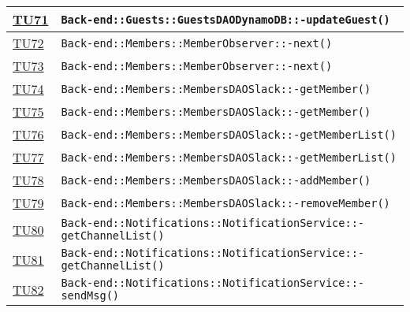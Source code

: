 \begin{longtable}{|>{\centering}m{1cm}|m{12cm}<{\centering}|}
\hyperlink{TU71}{TU71} & \texttt{Back-end::Guests::GuestsDAODynamoDB::-\linebreak updateGuest()}\\ \hline

\hyperlink{TU72}{TU72} & \texttt{Back-end::Members::MemberObserver::-\linebreak next()}\\ \hline

\hyperlink{TU73}{TU73} & \texttt{Back-end::Members::MemberObserver::-\linebreak next()}\\ \hline

\hyperlink{TU74}{TU74} & \texttt{Back-end::Members::MembersDAOSlack::-\linebreak getMember()}\\ \hline

\hyperlink{TU75}{TU75} & \texttt{Back-end::Members::MembersDAOSlack::-\linebreak getMember()}\\ \hline

\hyperlink{TU76}{TU76} & \texttt{Back-end::Members::MembersDAOSlack::-\linebreak getMemberList()}\\ \hline

\hyperlink{TU77}{TU77} & \texttt{Back-end::Members::MembersDAOSlack::-\linebreak getMemberList()}\\ \hline

\hyperlink{TU78}{TU78} & \texttt{Back-end::Members::MembersDAOSlack::-\linebreak addMember()}\\ \hline

\hyperlink{TU79}{TU79} & \texttt{Back-end::Members::MembersDAOSlack::-\linebreak removeMember()}\\ \hline

\hyperlink{TU80}{TU80} & \texttt{Back-end::Notifications::NotificationService::-\linebreak getChannelList()}\\ \hline

\hyperlink{TU81}{TU81} & \texttt{Back-end::Notifications::NotificationService::-\linebreak getChannelList()}\\ \hline

\hyperlink{TU82}{TU82} & \texttt{Back-end::Notifications::NotificationService::-\linebreak sendMsg()}\\ \hline


\end{longtable}
